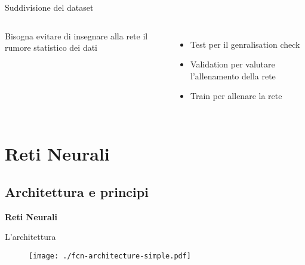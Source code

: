 \documentclass{beamer}
\begin{document}
\begin{frame}{Suddivisione del dataset}
\begin{columns}
      Bisogna evitare di insegnare alla rete il rumore statistico dei dati
      \begin{itemize}
        \item<2->Test per il genralisation check
        \item<3->Validation per valutare l'allenamento della rete
        \item<3->Train per allenare la rete
      \end{itemize}


    \end{columns}
\end{frame}

\section{Reti Neurali}
\subsection{Architettura e principi}
\begin{frame}
  \centering
  \Huge\bfseries
  Reti Neurali
\end{frame}

\begin{frame}{L'architettura}
  \begin{figure}
    \texttt{[image: ./fcn-architecture-simple.pdf]}
  \end{figure}

\end{frame}
\end{document}
